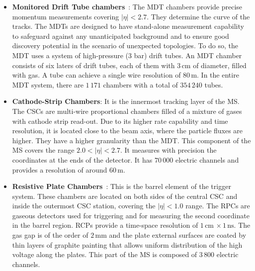 \begin{itemize}
	\item \textbf{Monitored Drift Tube chambers}~\cite{Livan:319197}: 
		The MDT chambers provide precise momentum
		measurements covering $|\eta|<2.7$. 
		They determine %
		the curve of the tracks. %
		The MDTs are designed to 
		have stand-alone measurement capability to 
		safeguard against any unanticipated background and to ensure 
		good discovery potential in the scenario of unexpected topologies. 
		To do so, the MDT uses a system of high-pressure (3 bar) drift tubes.
		An MDT chamber  consists of six laters of drift tubes, each of them with $3\,$cm of diameter, filled with gas. 
		A tube can achieve a single wire resolution of $80\,$\textmu m.
		In the entire MDT system, there are $1\,171$ chambers with a total of $354\,240$ tubes.
		

	\item \textbf{Cathode-Strip Chambers}: It is the innermost tracking layer of the MS. 
		The CSCs are multi-wire proportional chambers filled of a mixture of gases with cathode strip read-out.
		Due to its higher rate capability and time resolution, it is located close to the beam 
		axis, where the particle fluxes are higher. 
		They have a higher granularity than the MDT.
		This component of the MS
		covers the range $2.0 < |\eta| < 2.7$. It measures with precision the coordinates 
		at the ends of the detector. It has $70\,000$ electric channels and provides a resolution of 
		around $60\,$\textmu m. 
		
	\item \textbf{Resistive Plate Chambers}~\cite{Cattani_2011}: This is the barrel element of the trigger system. 
		These chambers are located on both sides of the central CSC and inside the outermost CSC station, covering
		the $|\eta| < 1.0$ range.
		The RPCs are gaseous detectors used for triggering and for measuring the second coordinate in the barrel region.
		RCPs provide a time-space resolution of $1 \, \textrm{cm} \, \times  1\,\textrm{ns}$.
		The gas gap is of the order of $2\,$mm and the plate external surfaces are coated by thin layers of graphite 
		painting that allows uniform distribution of the high voltage along the plates.
		This part of the MS  is composed of $3\,800$ electric channels.
		

\end{itemize}
